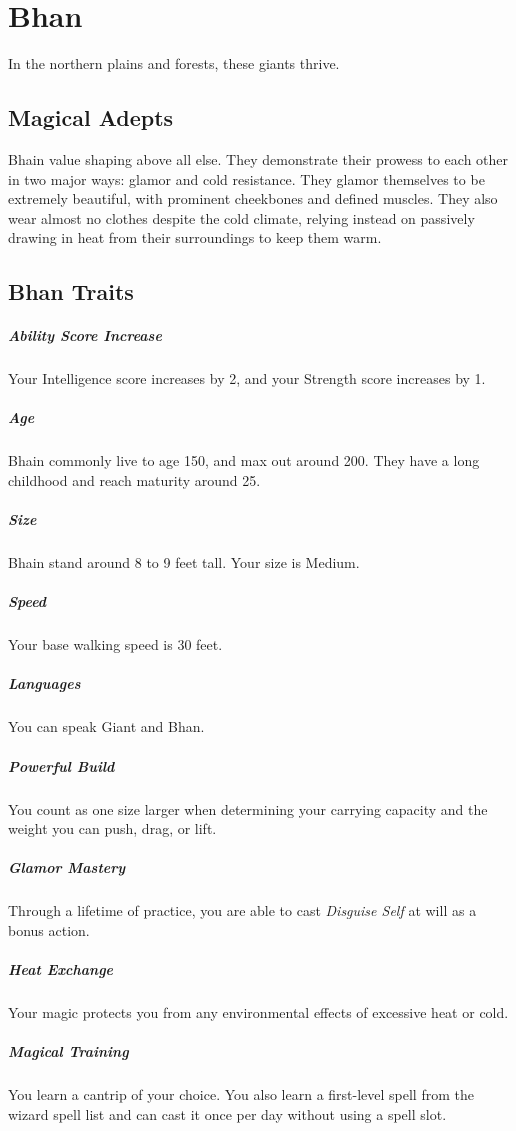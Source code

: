 \section{Bhan}
In the northern plains and forests, these giants thrive.

\subsection{Magical Adepts}
Bhain value shaping above all else.
They demonstrate their prowess to each other in two major ways: glamor and cold resistance.
They glamor themselves to be extremely beautiful, with prominent cheekbones and defined muscles.
They also wear almost no clothes despite the cold climate, relying instead on passively drawing in heat from their surroundings to keep them warm.


\subsection{Bhan Traits}
\subparagraph{Ability Score Increase}
Your Intelligence score increases by 2, and your Strength score increases by 1.

\subparagraph{Age}
Bhain commonly live to age 150, and max out around 200.
They have a long childhood and reach maturity around 25.

\subparagraph{Size}
Bhain stand around 8 to 9 feet tall.
Your size is Medium.

\subparagraph{Speed}
Your base walking speed is 30 feet.

\subparagraph{Languages}
You can speak Giant and Bhan.

\subparagraph{Powerful Build}
You count as one size larger when determining your carrying capacity and the weight you can push, drag, or lift.

\subparagraph{Glamor Mastery}
Through a lifetime of practice, you are able to cast \textit{Disguise Self} at will as a bonus action.

\subparagraph{Heat Exchange}
Your magic protects you from any environmental effects of excessive heat or cold.

\subparagraph{Magical Training}
You learn a cantrip of your choice.
You also learn a first-level spell from the wizard spell list and can cast it once per day without using a spell slot.
